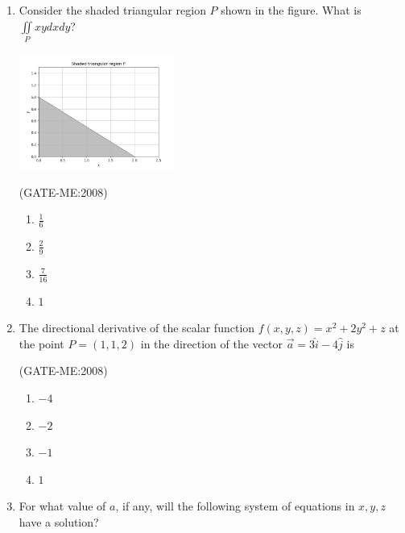 \documentclass[journal,12pt,onecolumn]{IEEEtran}
\theoremstyle{remark}
\begin{document}
\begin{enumerate}
 \item
        Consider the shaded triangular region $P$ shown in the figure. What is $\iint\limits_P xydxdy$?
        \vspace{0.2cm}
		\begin{center}
        \includegraphics[width=0.4\textwidth]{figs/graph.png}
		\end{center}
        \vspace{0.2cm}

        \hfill{(GATE-ME:2008)}
        \begin{multicols}{4}
            \begin{enumerate}
                \item $\frac{1}{6}$
                \item $\frac{2}{9}$
                \item $\frac{7}{16}$
                \item $1$
            \end{enumerate}
        \end{multicols}
    
    \item 
        The directional derivative of the scalar function $f(x,y,z) = x^2 + 2y^2 + z$ at the point $P = (1,1,2)$ in the direction of the vector $\vec{a} = 3\hat{i} - 4\hat{j}$ is

        \hfill{(GATE-ME:2008)}
        \begin{multicols}{4}
            \begin{enumerate}
                \item $-4$
                \item $-2$
                \item $-1$
                \item $1$\\
            \end{enumerate}
        \end{multicols}

    \item
        For what value of $a$, if any, will the following system of equations in $x, y, z$ have a solution?
              

\end{enumerate}
\end{document}
